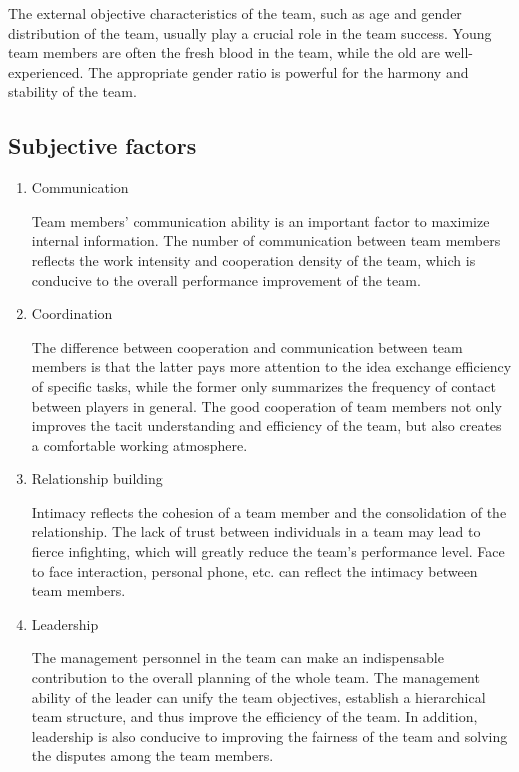 \documentclass{mcmthesis}
\begin{document}
{\begin{enumerate}
The external objective characteristics of the team, such as age and gender distribution of the team, usually play a crucial role in the team success. Young team members are often the fresh blood in the team, while the old are well-experienced. The appropriate gender ratio is powerful for the harmony and stability of the team.
\end{enumerate}
\subsection{Subjective factors}
\begin{enumerate}
\item Communication

Team members' communication ability is an important factor to maximize internal information. The number of communication between team members reflects the work intensity and cooperation density of the team, which is conducive to the overall performance improvement of the team. 


\item Coordination

The difference between cooperation and communication between team members is that the latter pays more attention to the idea exchange efficiency of specific tasks, while the former only summarizes the frequency of contact between players in general. The good cooperation of team members not only improves the tacit understanding and efficiency of the team, but also creates a comfortable working atmosphere.

\item Relationship building

Intimacy reflects the cohesion of a team member and the consolidation of the relationship. The lack of trust between individuals in a team may lead to fierce infighting, which will greatly reduce the team's performance level. Face to face interaction, personal phone, etc. can reflect the intimacy between team members.


\item Leadership

The management personnel in the team can make an indispensable contribution to the overall planning of the whole team. The management ability of the leader can unify the team objectives, establish a hierarchical team structure, and thus improve the efficiency of the team. In addition, leadership is also conducive to improving the fairness of the team and solving the disputes among the team members.
\end{enumerate}

}
\end{document}
